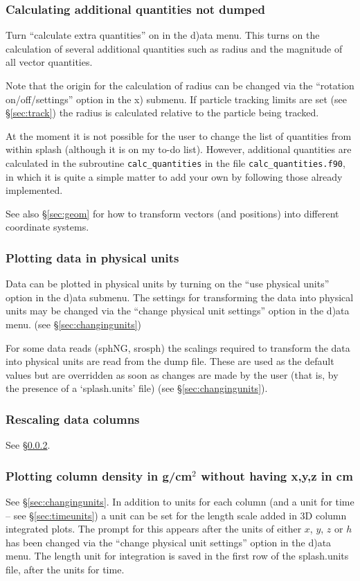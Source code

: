 \documentclass[a4paper,11pt]{article}
\begin{document}
\subsubsection{ Calculating additional quantities not dumped}
Turn ``calculate extra quantities'' on in the d)ata menu. This turns on the calculation of several additional quantities such as radius and the magnitude of all vector quantities. 

 Note that the origin for the calculation of radius can be changed via the ``rotation on/off/settings'' option in the x) submenu. If particle tracking limits are set (see \S\ref{sec:track}) the radius is calculated relative to the particle being tracked.

 At the moment it is not possible for the user to change the list of quantities from within splash (although it is on my to-do list). However, additional quantities are calculated in the subroutine \verb+calc_quantities+ in the file \verb+calc_quantities.f90+, in which it is quite a simple matter to add your own by following those already implemented. 

See also \S\ref{sec:geom} for how to transform vectors (and positions) into different coordinate systems. 

\subsubsection{ Plotting data in physical units}
\label{sec:physicalunits}
 Data can be plotted in physical units by turning on the ``use physical units'' option in the d)ata submenu. The settings for transforming the data into physical units may be changed via the ``change physical unit settings'' option in the d)ata menu. (see \S\ref{sec:changingunits})

 For some data reads (sphNG, srosph) the scalings required to transform the data into physical units are read from the dump file. These are used as the default values but are overridden as soon as changes are made by the user (that is, by the presence of a `splash.units' file) (see \S\ref{sec:changingunits}).
 
\subsubsection{ Rescaling data columns}
See \S\ref{sec:physicalunits}.

\subsubsection{ Plotting column density in g/cm$^{2}$ without having x,y,z in cm}
See \S\ref{sec:changingunits}. In addition to units for each column (and a unit for time -- see \S\ref{sec:timeunits}) a unit can be set for the length scale added in 3D column integrated plots. The prompt for this appears after the units of either $x$, $y$, $z$ or $h$ has been changed via the ``change physical unit settings'' option in the d)ata menu. The length unit for integration is saved in the first row of the splash.units file, after the units for time.
\end{document}
